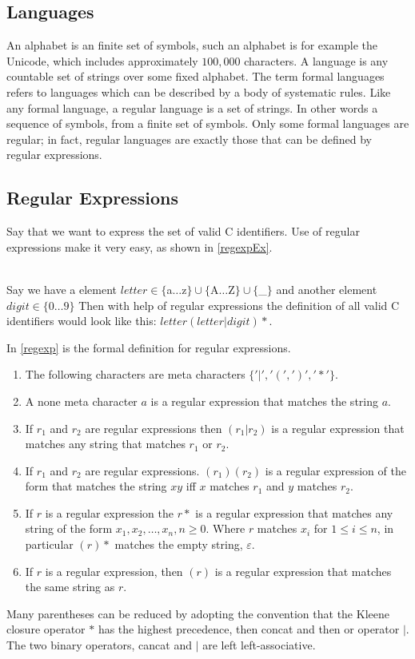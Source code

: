 \subsection{Languages}
An alphabet is an finite set of symbols, such an alphabet is for example the 
Unicode, which includes approximately $100,000$ characters. A language is any 
countable set of strings over some fixed alphabet. \cite{Aho2006}
The term formal languages refers to languages which can be described by a body 
of systematic rules. Like any formal language, a regular language is a set of 
strings. In other words a sequence of symbols, from a finite set of symbols. 
Only some formal languages are regular; in fact, regular languages are exactly 
those that can be defined by regular expressions. \cite{Ranta2012}
\subsection{Regular Expressions}
Say that we want to express the set of valid C identifiers. Use of regular 
expressions make it very easy, as shown in \cref{regexpEx}. 
\begin{example}\label{regexpEx} \cite{Aho2006}\\
Say we have a element $letter \in \{$a$ \dots $z$\} \cup \{$A$ \dots $Z$\} \cup 
\{$\_$\}$
and another element $digit \in \{0 \dots 9\}$
Then with help of regular expressions the definition of all valid C identifiers 
would look like this: $letter (letter | digit)*$. 
\end{example}
In \cref{regexp} is the formal definition for regular expressions.
\begin{definition}\label{regexp} \cite{Aho1990}
\begin{enumerate}
  \item The following characters are meta characters $\{ '|', '(', ')', '*' \}$.
  \item A none meta character $a$ is a regular expression that matches the 
      string $a$.
  \item If $r_1$ and $r_2$ are regular expressions then $(r_1 | r_2)$ is a 
      regular expression that matches any string that matches $r_1$ or $r_2$.
  \item If $r_1$ and $r_2$ are regular expressions. $(r_1)(r_2)$ is a regular
      expression of the form that matches the string $xy$ iff $x$ matches $r_1$
      and $y$ matches $r_2$.
  \item If $r$ is a regular expression the $r*$ is a regular expression that
      matches any string of the form $x_1, x_2, \dots , x_n, n \geq 0$.
      Where $r$ matches $x_i$ for $1 \leq i \leq n$, in particular $(r)*$ 
      matches the empty string, $\varepsilon$.
  \item If $r$ is a regular expression, then $(r)$ is a regular expression that
      matches the same string as $r$.
\end{enumerate}
\end{definition}
Many parentheses can be reduced by adopting the convention that the Kleene
closure operator $*$ has the highest precedence, then concat and then or
operator $|$. The two binary operators, cancat and $|$ are left 
left-associative. \cite{Aho1990}
